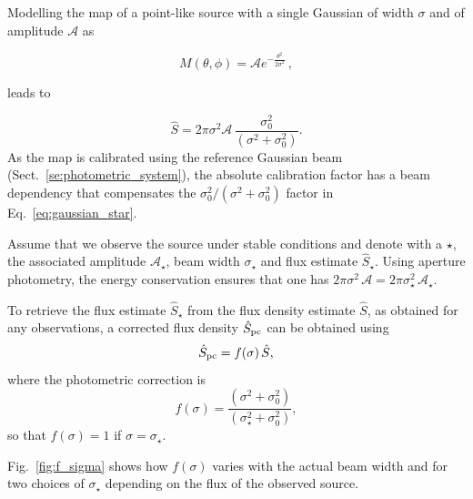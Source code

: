 Modelling the map of a point-like source with a single Gaussian of
width $\sigma$ and of amplitude $\mathcal{A}$ as

\begin{equation}
  M(\theta, \phi) = \mathcal{A} e^{-\frac{\theta^{2}}{2\sigma^2}}\,,
  \label{eq:pointsource_map}
\end{equation}

leads to

\begin{equation}
  \hat{S}  = 2\pi \sigma^2 \mathcal{A} \,  \frac{\sigma_0^2}{(\sigma^2 + \sigma_0^2)}.
  \label{eq:gaussian_star}
\end{equation}
As the map is calibrated using the reference Gaussian beam
(Sect.~\ref{se:photometric_system}), the absolute calibration factor %
has a beam dependency that compensates the
$\sigma_0^2/(\sigma^2 + \sigma_0^2)$ factor in Eq.~\ref{eq:gaussian_star}.

Assume that we observe the source under stable conditions and
denote with a $\star$, the associated amplitude $\mathcal{A}_\star$, beam width
$\sigma_\star$ and flux estimate $\hat{S}_\star$. Using aperture
photometry, the energy conservation ensures that one has
$2\pi\sigma^2 \, \mathcal{A} = 2\pi\sigma_\star^2 \, \mathcal{A_\star}$.

To retrieve the flux estimate $\hat{S}_\star$ from the flux density
estimate $\hat{S}$, as obtained for any observations, a
corrected flux density $\hat{S}_{\rm{pc}}$ can be obtained using 
\begin{equation}
  \hat{S}_{\rm{pc}} = f(\sigma) \, \hat{S},
\end{equation} 
where the photometric correction is 
\begin{equation}
  f(\sigma) = \frac{(\sigma^2 + \sigma_0^2)}{(\sigma_\star^2+\sigma_0^2)}, 
\end{equation} 
so that $f(\sigma) = 1$ if $\sigma=\sigma_\star$.

%

Fig.~\ref{fig:f_sigma} shows how $f(\sigma)$ varies with the actual beam width
and for two choices of $\sigma_\star$ depending on the flux of the observed source.

